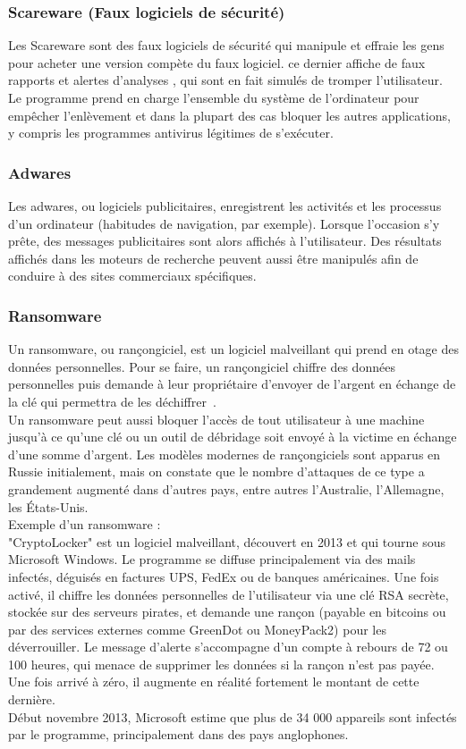 \subsubsection{Scareware (Faux logiciels de sécurité)}
Les Scareware  sont des faux logiciels de sécurité qui manipule et effraie les gens  pour acheter une version compète du faux logiciel. ce dernier affiche de faux rapports et alertes d'analyses , qui sont en fait simulés de tromper l'utilisateur. Le programme prend en charge l'ensemble du système de l'ordinateur pour empêcher l'enlèvement et dans la plupart des cas bloquer les autres applications, y compris les programmes antivirus légitimes de s'exécuter.
\subsubsection{Adwares}
Les adwares, ou logiciels publicitaires, enregistrent les activités et les processus d'un ordinateur (habitudes de navigation, par exemple). Lorsque l'occasion s'y prête, des messages publicitaires sont alors affichés à l'utilisateur. Des résultats affichés dans les moteurs de recherche peuvent aussi être manipulés afin de conduire à des sites commerciaux spécifiques.
\subsubsection{Ransomware}
Un ransomware, ou rançongiciel, est un logiciel malveillant qui prend en otage des données personnelles. Pour se faire, un rançongiciel chiffre des données personnelles puis demande à leur propriétaire d'envoyer de l'argent en échange de la clé qui permettra de les déchiffrer~\cite{rans}.\\

Un ransomware peut aussi bloquer l'accès de tout utilisateur à une machine jusqu'à ce qu'une clé ou un outil de débridage soit envoyé à la victime en échange d'une somme d'argent. Les modèles modernes de rançongiciels sont apparus en Russie initialement, mais on constate que le nombre d'attaques de ce type a grandement augmenté dans d'autres pays, entre autres l'Australie, l'Allemagne, les États-Unis.\\

Exemple d'un ransomware :\\
"CryptoLocker" est un logiciel malveillant, découvert en 2013 et qui tourne sous Microsoft Windows. Le programme se diffuse principalement via des mails infectés, déguisés en factures UPS, FedEx ou de banques américaines. Une fois activé, il chiffre les données personnelles de l'utilisateur via une clé RSA secrète, stockée sur des serveurs pirates, et demande une rançon (payable en bitcoins ou par des services externes comme GreenDot ou MoneyPack2) pour les déverrouiller. Le message d'alerte s'accompagne d'un compte à rebours de 72 ou 100 heures, qui menace de supprimer les données si la rançon n'est pas payée. Une fois arrivé à zéro, il augmente en réalité fortement le montant de cette dernière.\\
Début novembre 2013, Microsoft estime que plus de 34 000 appareils sont infectés par le programme, principalement dans des pays anglophones.

